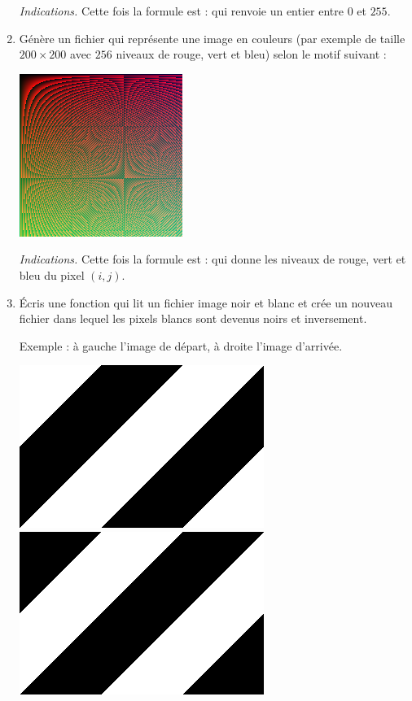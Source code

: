 \documentclass[11pt,class=report,crop=false]{standalone}
\begin{document}
\begin{activite}
\begin{enumerate}
\emph{Indications.} Cette fois la formule est :
qui renvoie un entier entre $0$ et $255$.

   \item Génère un fichier  qui représente une image en couleurs (par exemple de taille $200 \times 200$ avec $256$ niveaux de rouge, vert et bleu) selon le motif suivant :
\begin{center}
\includegraphics[scale=\myscale,scale=0.7]{ecran-image_coul}
\end{center}   

\emph{Indications.} Cette fois la formule est :
qui donne les niveaux de rouge, vert et bleu du pixel $(i,j)$.

\item Écris une fonction  qui lit un fichier image noir et blanc  et crée un nouveau fichier dans lequel les pixels blancs sont devenus noirs et inversement. 

Exemple : à gauche l'image de départ, à droite l'image d'arrivée.
\begin{center}
\includegraphics[scale=\myscale,scale=0.3]{ecran-simple_nb}\qquad\qquad
\includegraphics[scale=\myscale,scale=0.3]{ecran-simple_nb_inverse}
\end{center} 


\end{enumerate}
\end{activite}
\end{document}
